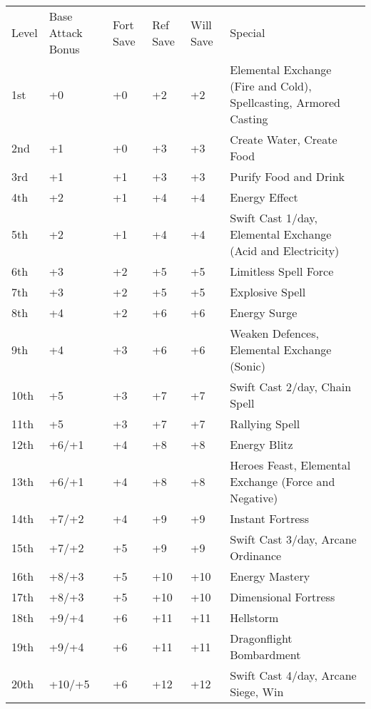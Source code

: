 \begin{table}[htb]
\begin{small}
\begin{tabular}{lp{3cm}p{0.7cm}p{0.7cm}p{0.7cm}l}
Level  &Base Attack Bonus &Fort Save &Ref Save &Will Save &Special\\
1st &+0 &+0 &+2 &+2 &Elemental Exchange (Fire and Cold), Spellcasting, Armored Casting\\
2nd &+1 &+0 &+3 &+3 &Create Water, Create Food\\
3rd &+1 &+1 &+3 &+3 &Purify Food and Drink\\
4th &+2 &+1 &+4 &+4 &Energy Effect\\
5th &+2 &+1 &+4 &+4 &Swift Cast 1/day, Elemental Exchange (Acid and Electricity)\\
6th &+3 &+2 &+5 &+5 &Limitless Spell Force\\
7th &+3 &+2 &+5 &+5 &Explosive Spell\\
8th &+4 &+2 &+6 &+6 &Energy Surge\\
9th &+4 &+3 &+6 &+6 &Weaken Defences, Elemental Exchange (Sonic)\\
10th &+5 &+3 &+7 &+7 &Swift Cast 2/day, Chain Spell\\
11th &+5 &+3 &+7 &+7 &Rallying Spell\\
12th &+6/+1 &+4 &+8 &+8 &Energy Blitz\\
13th &+6/+1 &+4 &+8 &+8 &Heroes Feast, Elemental Exchange (Force and Negative)\\
14th &+7/+2 &+4 &+9 &+9 &Instant Fortress\\
15th &+7/+2 &+5 &+9 &+9 &Swift Cast 3/day, Arcane Ordinance\\
16th &+8/+3 &+5 &+10 &+10 &Energy Mastery\\
17th &+8/+3 &+5 &+10 &+10 &Dimensional Fortress\\
18th &+9/+4 &+6 &+11 &+11 &Hellstorm\\
19th &+9/+4 &+6 &+11 &+11 &Dragonflight Bombardment\\
20th &+10/+5 &+6 &+12 &+12 &Swift Cast 4/day, Arcane Siege, Win\\
\end{tabular}
\end{small}
\end{table}

